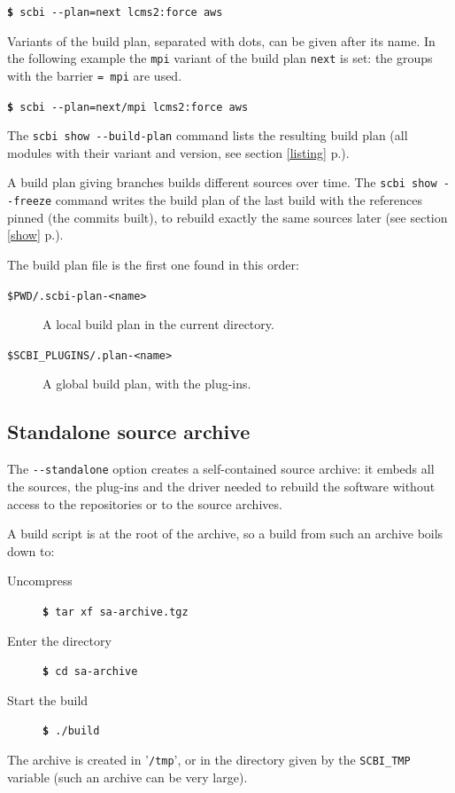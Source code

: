 \documentclass[a4paper,12pt,twoside]{article}
\newcommand{\code}[1]{\texttt{#1}}
\newcommand{\seeref}[1]{see section \ref{#1} p.\pageref{#1}}
\newcommand{\file}[1]{'{\texttt{#1}}'}
\newcommand{\cmd}[1]{\tabto{1cm}\hspace{0.5cm}\texttt{\textbf{\$} #1}}
\newcommand{\ddash}{-{}-}
\begin{document}
\cmd{scbi \ddash{}plan=next lcms2:force aws}

Variants of the build plan, separated with dots, can be given after its name. In the following example the \code{mpi} variant of the build plan \code{next} is set: the groups with the barrier \code{= mpi} are used.

\cmd{scbi \ddash{}plan=next/mpi lcms2:force aws}

The \code{scbi show \ddash{}build-plan} command lists the resulting build plan (all modules with their variant and version, \seeref{listing}).

A build plan giving branches builds different sources over time. The \code{scbi show \ddash{}freeze} command writes the build plan of the last build with the references pinned (the commits built), to rebuild exactly the same sources later (\seeref{show}).

The build plan file is the first one found in this order:

\begin{description}
	\item[\code{\$PWD/.scbi-plan-<name>}] A local build plan in the current directory.

	\item[\code{\$SCBI\_PLUGINS/.plan-<name>}] A global build plan, with the plug-ins.
\end{description}

\subsection{Standalone source archive}
\label{standalone}

The \code{\ddash{}standalone} option creates a self-contained source archive: it embeds all the sources, the plug-ins and the driver needed to rebuild the software without access to the repositories or to the source archives.

A build script is at the root of the archive, so a build from such an archive boils down to:

\begin{description}
	\item[Uncompress] \cmd{tar xf sa-archive.tgz}
	\item[Enter the directory] \cmd{cd sa-archive}
	\item[Start the build] \cmd{./build}
\end{description}

The archive is created in \file{/tmp}, or in the directory given by the \code{SCBI\_TMP} variable (such an archive can be very large).
\end{document}

